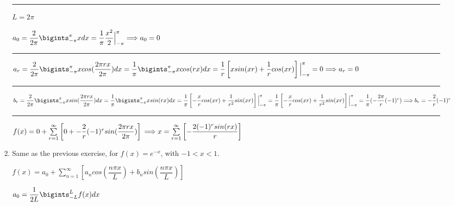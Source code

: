 \documentclass[fleqn]{article}
\begin{document}
\begin{enumerate}
      \textcolor{hwColor}{ 
        \rule{15cm}{0.4pt} 
      }

      \textcolor{hwColor}{
        $L=2\pi$
      }

      \textcolor{hwColor}{
        $
          a_0=\dfrac{2}{2\pi}\bigints_{-\pi}^{\pi}xdx=\dfrac{1}{\pi}\dfrac{x^2}{2}\Big|_{-\pi}^{\pi} \Longrightarrow a_0=0
        $
      }

      \textcolor{hwColor}{ 
        \rule{15cm}{0.4pt} 
      }

      \textcolor{hwColor}{
        $
          a_r=\dfrac{2}{2\pi}\bigints_{-\pi}^{\pi} xcos(\dfrac{2\pi rx}{2\pi})dx=\dfrac{1}{\pi}\bigints_{-\pi}^{\pi} xcos(rx)dx=\dfrac{1}{r}\left[xsin(xr)+\dfrac{1}{r}cos(xr)\right]\Big|_{-\pi}^{\pi}=0 \\
          \\
          \Longrightarrow a_r=0
        $
      }

      \textcolor{hwColor}{ 
        \rule{15cm}{0.4pt} 
      }

      \textcolor{hwColor}{
        $
          b_r=\dfrac{2}{2\pi}\bigints_{-\pi}^{\pi} xsin(\dfrac{2\pi rx}{2\pi})dx=\dfrac{1}{\pi}\bigints_{-\pi}^{\pi} xsin(rx)dx=\dfrac{1}{\pi}\left[-\dfrac{x}{r}cos(xr)+\dfrac{1}{r^2}sin(xr)\right]\Big|_{-\pi}^{\pi} \\
          \\
          =\dfrac{1}{\pi}\left[-\dfrac{x}{r}cos(xr)+\dfrac{1}{r^2}sin(xr)\right]\Big|_{-\pi}^{\pi}=\dfrac{1}{\pi}(-\dfrac{2\pi}{r}(-1)^r)
          \Longrightarrow b_r=-\dfrac{2}{r}(-1)^r
        $
      }

      \textcolor{hwColor}{ 
        \rule{15cm}{0.4pt} 
      }

      \textcolor{hwColor}{
        $
          f(x)=0+\sum\limits_{r=1}^{\infty}\left[0+-\dfrac{2}{r}(-1)^r sin(\dfrac{2\pi rx}{2\pi})\right] \\
          \\
          \Longrightarrow x=\sum\limits_{r=1}^{\infty}\left[-\dfrac{2(-1)^r sin(rx)}{r}\right]
        $
      }
      
    \item Same as the previous exercise, for $f(x)=e^{-x}$,  with $-1 < x < 1$. 

    
    \textcolor{hwColor}{
      $f(x)=a_0+\sum\limits_{n=1}^{\infty}\left[a_n cos(\dfrac{n\pi x}{L})+b_n sin(\dfrac{n\pi x}{L})\right]$
    }

    \textcolor{hwColor}{
      $
        a_0=\dfrac{1}{2L}\bigints_{-L}^{L} f(x)dx
      $
    }


\end{enumerate}
\end{document}
